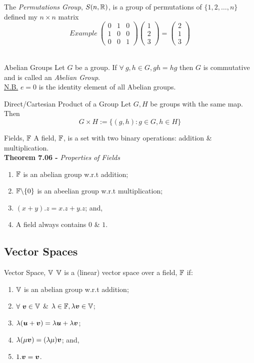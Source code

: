 \documentclass[11pt,a4paper]{article}
\begin{document}
The \textit{Permutations Group}, $S(n, \mathbb{R})$, is a group of permutations of $\{1, 2, \dots, n\}$ defined my $n \times n$ matrix
$$\mathrm{\textit{Example}\ }\begin{pmatrix} 0 & 1 & 0 \\ 1 & 0 & 0 \\ 0 & 0 & 1 \end{pmatrix} \begin{pmatrix}1 \\ 2 \\3 \end{pmatrix} = \begin{pmatrix}2 \\ 1 \\ 3 \end{pmatrix}$$\

\subtitle{Theorem 7.03 - }{Abelian Groups}
Let $G$ be a group. If $\forall\ g, h \in G, gh = hg$ then $G$ is commutative and is called an \textit{Abelian Group}.\\
\underline{N.B.} $e = 0$ is the identity element of all Abelian groups.\\

\subtitle{Definition 7.04 - }{Direct/Cartesian Product of a Group}
Let $G, H$ be groups with the same map. Then $$G \times H := \{(g, h) : g \in G, h \in H\}$$

\subtitle{Definition 7.05 - }{Fields, $\mathbb{F}$}
A field, $\mathbb{F}$, is a set with two binary operations: addition \& multiplication.\\

\textbf{Theorem 7.06 - }\textit{Properties of Fields}
\begin{enumerate}[label=\roman*)]
  \item $\mathbb{F}$ is an abelian group w.r.t addition;
  \item $\mathbb{F} \backslash \{0\}$  is an abeelian group w.r.t multiplication;
  \item $(x + y) . z = x.z + y.z$; and,
  \item A field always contains $0$ \& $1$.
\end{enumerate}

\subsection{Vector Spaces}

\subtitle{Definition 7.07 - }{Vector Space, $\mathbb{V}$}
$\mathbb{V}$ is a (linear) vector space over a field, $\mathbb{F}$ if:
\begin{enumerate}[label=\roman*)]
  \item $\mathbb{V}$ is an abelian group w.r.t addition;
  \item $\forall\ \boldsymbol{v} \in \mathbb{V}$ \& $\lambda \in \mathbb{F}, \lambda\boldsymbol{v} \in \mathbb{V}$;
  \item $\lambda(\boldsymbol{u} + \boldsymbol{v}) = \lambda\boldsymbol{u} + \lambda\boldsymbol{v}$;
  \item $\lambda(\mu\boldsymbol{v}) = (\lambda\mu)\boldsymbol{v}$; and,
  \item $1.\boldsymbol{v} = \boldsymbol{v}$.
\end{enumerate}
\end{document}
